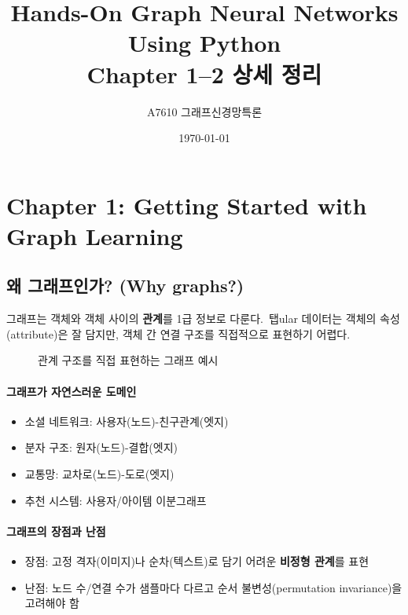 ﻿\documentclass[11pt,a4paper]{article}
\title{Hands-On Graph Neural Networks Using Python\\Chapter 1--2 상세 정리}
\author{A7610 그래프신경망특론}
\date{\today}
\begin{document}
\maketitle
\tableofcontents
\newpage

\section{Chapter 1: Getting Started with Graph Learning}

\subsection{왜 그래프인가? (Why graphs?)}
그래프는 객체와 객체 사이의 \textbf{관계}를 1급 정보로 다룬다.\
탭ular 데이터는 객체의 속성(attribute)은 잘 담지만, 객체 간 연결 구조를 직접적으로 표현하기 어렵다.

\begin{figure}[h]
\centering
{}
\caption{관계 구조를 직접 표현하는 그래프 예시}
\end{figure}

\paragraph{그래프가 자연스러운 도메인}
\begin{itemize}[leftmargin=*]
  \item 소셜 네트워크: 사용자(노드)-친구관계(엣지)
  \item 분자 구조: 원자(노드)-결합(엣지)
  \item 교통망: 교차로(노드)-도로(엣지)
  \item 추천 시스템: 사용자/아이템 이분그래프
\end{itemize}

\paragraph{그래프의 장점과 난점}
\begin{itemize}[leftmargin=*]
  \item 장점: 고정 격자(이미지)나 순차(텍스트)로 담기 어려운 \textbf{비정형 관계}를 표현
  \item 난점: 노드 수/연결 수가 샘플마다 다르고 순서 불변성(permutation invariance)을 고려해야 함
\end{itemize}
\end{document}
